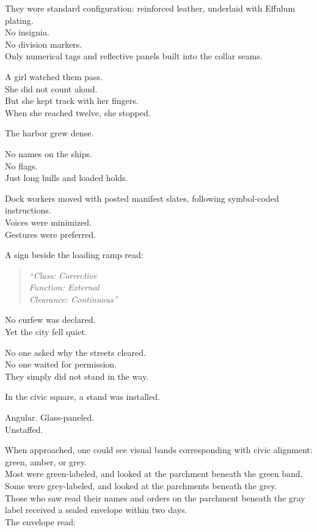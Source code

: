 \documentclass[12pt]{article}
\begin{document}
They wore standard configuration: reinforced leather, underlaid with Effulum plating.\\
No insignia.\\
No division markers.\\
Only numerical tags and reflective panels built into the collar seams.

\vspace{1em}

A girl watched them pass.\\
She did not count aloud.\\
But she kept track with her fingers.\\
When she reached twelve, she stopped.

\vspace{1em}

The harbor grew dense.

No names on the ships.\\
No flags.\\
Just long hulls and loaded holds.

Dock workers moved with posted manifest slates, following symbol-coded instructions.\\
Voices were minimized.\\
Gestures were preferred.

A sign beside the loading ramp read:

\begin{quote}
\textit{“Class: Corrective\\
Function: External\\
Clearance: Continuous”}
\end{quote}

\vspace{1em}

No curfew was declared.\\
Yet the city fell quiet.

No one asked why the streets cleared.\\
No one waited for permission.\\
They simply did not stand in the way.

\vspace{1em}

In the civic square, a stand was installed.

Angular. Glass-paneled.\\
Unstaffed.

When approached, one could see visual bands corresponding with civic alignment: green, amber, or grey.\\
Most were green-labeled, and looked at the parchment beneath the green band.\\
Some were grey-labeled, and looked at the parchments beneath the grey.\\
Those who saw read their names and orders on the parchment beneath the gray label received a sealed envelope within two days.\\
The envelope read:
\end{document}
